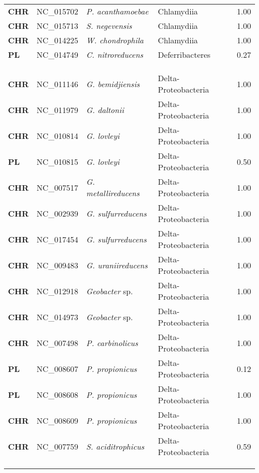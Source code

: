 \begin{adjustwidth}{-3cm}{2cm}
{\begin{supertabular}{>{\bfseries}l|p{0.1\textwidth}p{0.14\textwidth}l|l}
CHR & NC\_015702 & \textit{P. acanthamoebae} & Chlamydiia & 1.00\\
CHR & NC\_015713 & \textit{S. negevensis} & Chlamydiia & 1.00\\
CHR & NC\_014225 & \textit{W. chondrophila} & Chlamydiia & 1.00\\
PL & NC\_014749 & \textit{C. nitroreducens} & Deferribacteres & 0.27\\
\\
\\
\hline\\
CHR & NC\_011146 & \textit{G. bemidjiensis} & Delta-Proteobacteria & 1.00\\
CHR & NC\_011979 & \textit{G. daltonii} & Delta-Proteobacteria & 1.00\\
CHR & NC\_010814 & \textit{G. lovleyi} & Delta-Proteobacteria & 1.00\\
PL & NC\_010815 & \textit{G. lovleyi} & Delta-Proteobacteria & 0.50\\
CHR & NC\_007517 & \textit{G. metallireducens} & Delta-Proteobacteria & 1.00\\
CHR & NC\_002939 & \textit{G. sulfurreducens} & Delta-Proteobacteria & 1.00\\
CHR & NC\_017454 & \textit{G. sulfurreducens} & Delta-Proteobacteria & 1.00\\
CHR & NC\_009483 & \textit{G. uraniireducens} & Delta-Proteobacteria & 1.00\\
CHR & NC\_012918 & \textit{Geobacter} sp. & Delta-Proteobacteria & 1.00\\
CHR & NC\_014973 & \textit{Geobacter} sp. & Delta-Proteobacteria & 1.00\\
CHR & NC\_007498 & \textit{P. carbinolicus} & Delta-Proteobacteria & 1.00\\
PL & NC\_008607 & \textit{P. propionicus} & Delta-Proteobacteria & 0.12\\
PL & NC\_008608 & \textit{P. propionicus} & Delta-Proteobacteria & 1.00\\
CHR & NC\_008609 & \textit{P. propionicus} & Delta-Proteobacteria & 1.00\\
CHR & NC\_007759 & \textit{S. aciditrophicus} & Delta-Proteobacteria & 0.59\\
\\
\\
\hline\\

\end{supertabular}}
\end{adjustwidth}

